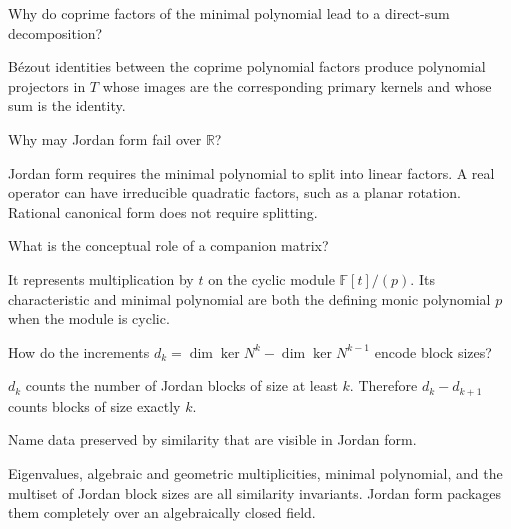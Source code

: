 \begin{problem}\label{prob:i12-problem-07}
Why do coprime factors of the minimal polynomial lead to a direct-sum decomposition?
\end{problem}
\begin{solution}
Bézout identities between the coprime polynomial factors produce polynomial projectors in $T$ whose images are the corresponding primary kernels and whose sum is the identity.
\end{solution}

\begin{problem}\label{prob:i12-problem-08}
Why may Jordan form fail over $\mathbb R$?
\end{problem}
\begin{solution}
Jordan form requires the minimal polynomial to split into linear factors. A real operator can have irreducible quadratic factors, such as a planar rotation. Rational canonical form does not require splitting.
\end{solution}

\begin{problem}\label{prob:i12-problem-09}
What is the conceptual role of a companion matrix?
\end{problem}
\begin{solution}
It represents multiplication by $t$ on the cyclic module $\mathbb F[t]/(p)$. Its characteristic and minimal polynomial are both the defining monic polynomial $p$ when the module is cyclic.
\end{solution}

\begin{problem}\label{prob:i12-problem-10}
How do the increments $d_k=\dim\ker N^k-\dim\ker N^{k-1}$ encode block sizes?
\end{problem}
\begin{solution}
$d_k$ counts the number of Jordan blocks of size at least $k$. Therefore $d_k-d_{k+1}$ counts blocks of size exactly $k$.
\end{solution}

\begin{problem}\label{prob:i12-problem-11}
Name data preserved by similarity that are visible in Jordan form.
\end{problem}
\begin{solution}
Eigenvalues, algebraic and geometric multiplicities, minimal polynomial, and the multiset of Jordan block sizes are all similarity invariants. Jordan form packages them completely over an algebraically closed field.
\end{solution}

